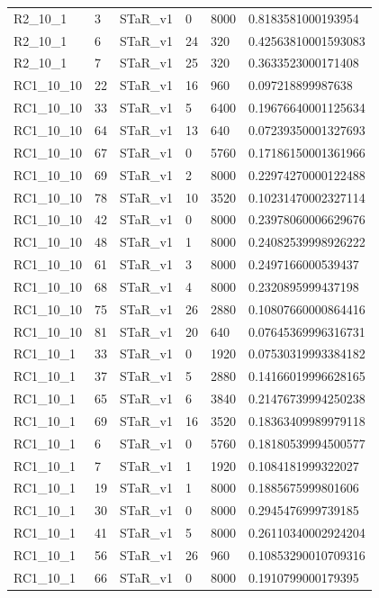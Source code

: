 \begin{tabular}{llllll}
 R2\_10\_1 & 3 & STaR\_v1 & 0 & 8000 & 0.8183581000193954 \\
 R2\_10\_1 & 6 & STaR\_v1 & 24 & 320 & 0.42563810001593083 \\
 R2\_10\_1 & 7 & STaR\_v1 & 25 & 320 & 0.3633523000171408 \\
 RC1\_10\_10 & 22 & STaR\_v1 & 16 & 960 & 0.097218899987638 \\
 RC1\_10\_10 & 33 & STaR\_v1 & 5 & 6400 & 0.19676640001125634 \\
 RC1\_10\_10 & 64 & STaR\_v1 & 13 & 640 & 0.07239350001327693 \\
 RC1\_10\_10 & 67 & STaR\_v1 & 0 & 5760 & 0.17186150001361966 \\
 RC1\_10\_10 & 69 & STaR\_v1 & 2 & 8000 & 0.22974270000122488 \\
 RC1\_10\_10 & 78 & STaR\_v1 & 10 & 3520 & 0.10231470002327114 \\
 RC1\_10\_10 & 42 & STaR\_v1 & 0 & 8000 & 0.23978060006629676 \\
 RC1\_10\_10 & 48 & STaR\_v1 & 1 & 8000 & 0.24082539998926222 \\
 RC1\_10\_10 & 61 & STaR\_v1 & 3 & 8000 & 0.2497166000539437 \\
 RC1\_10\_10 & 68 & STaR\_v1 & 4 & 8000 & 0.2320895999437198 \\
 RC1\_10\_10 & 75 & STaR\_v1 & 26 & 2880 & 0.10807660000864416 \\
 RC1\_10\_10 & 81 & STaR\_v1 & 20 & 640 & 0.07645369996316731 \\
 RC1\_10\_1 & 33 & STaR\_v1 & 0 & 1920 & 0.07530319993384182 \\
 RC1\_10\_1 & 37 & STaR\_v1 & 5 & 2880 & 0.14166019996628165 \\
 RC1\_10\_1 & 65 & STaR\_v1 & 6 & 3840 & 0.21476739994250238 \\
 RC1\_10\_1 & 69 & STaR\_v1 & 16 & 3520 & 0.18363409989979118 \\
 RC1\_10\_1 & 6 & STaR\_v1 & 0 & 5760 & 0.18180539994500577 \\
 RC1\_10\_1 & 7 & STaR\_v1 & 1 & 1920 & 0.1084181999322027 \\
 RC1\_10\_1 & 19 & STaR\_v1 & 1 & 8000 & 0.1885675999801606 \\
 RC1\_10\_1 & 30 & STaR\_v1 & 0 & 8000 & 0.2945476999739185 \\
 RC1\_10\_1 & 41 & STaR\_v1 & 5 & 8000 & 0.26110340002924204 \\
 RC1\_10\_1 & 56 & STaR\_v1 & 26 & 960 & 0.10853290010709316 \\
 RC1\_10\_1 & 66 & STaR\_v1 & 0 & 8000 & 0.1910799000179395 \\

\end{tabular}
